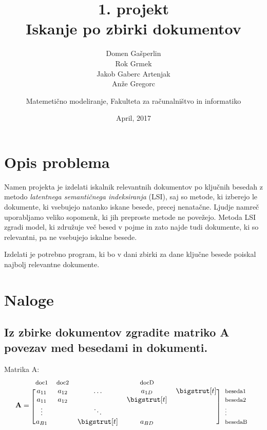 \documentclass{article}
\begin{document}
\begin{titlepage}
\author{Domen Gašperlin\\Rok Grmek\\Jakob Gaberc Artenjak\\Anže Gregorc\and Matemetično modeliranje, Fakulteta za računalništvo in informatiko}
\title{\textbf{1. projekt\\Iskanje po zbirki dokumentov}}
\date{April, 2017}

\maketitle

\end{titlepage}

\section{Opis problema}
Namen projekta je izdelati iskalnik relevantnih dokumentov po ključnih besedah z metodo\textit{ latentnega semantičnega indeksiranja} (LSI), saj so metode, ki izberejo le dokumente, ki vsebujejo natanko iskane besede, precej nenatačne. Ljudje namreč uporabljamo veliko sopomenk, ki jih preproste metode ne povežejo. Metoda LSI zgradi model, ki združuje več besed v pojme in zato najde tudi dokumente, ki so relevantni, pa ne vsebujejo iskalne besede.

Izdelati je potrebno program, ki bo v dani zbirki za dane ključne besede poiskal najbolj relevantne dokumente.

\section{Naloge}
\subsection{Iz zbirke dokumentov zgradite matriko A povezav med besedami in dokumenti.}
\label{sec:matrikaA}

Matrika A:
\begin{equation*}
  \mathbf{A}=
  \begin{blockarray}{*{5}{c} l}
    \begin{block}{*{5}{>{$\footnotesize}c<{$}} l}
      doc1 & doc2 &  &  docD & \\
    \end{block}
    \begin{block}{[*{5}{c}]>{$\footnotesize}l<{$}}
      a_{11}  & a_{12} & \dots           & a_{1D}       & \bigstrut[t]& beseda1 \\
       a_{11} & a_{12} &                    & \bigstrut[t] &                   &   beseda2 \\
      \vdots   &             & \ddots         &                    &                   &   \vdots  \\
      a_{B1} &              &  \bigstrut[t] & a_{BD}       &                   &  besedaB \\
    \end{block}
  \end{blockarray}
\end{equation*}
\end{document}
